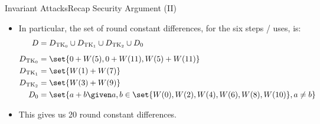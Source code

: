 \begin{frame}{Invariant Attacks}{Recap Security Argument (II)}
\begin{itemize}
            \item In particular, the set of round constant differences, for the six steps \clyde/ uses, is:
                \begin{align*}
                    D &= D_{\mathrm{TK}_0} \cup D_{\mathrm{TK}_1} \cup D_{\mathrm{TK}_2} \cup D_0\\[5pt]
                    D_{\mathrm{TK}_0} &= \set{0 + W(5), 0 + W(11), W(5) + W(11)} \\
                    D_{\mathrm{TK}_1} &= \set{W(1) + W(7)} \\
                    D_{\mathrm{TK}_2} &= \set{W(3) + W(9)} \\
                    D_{0} &= \set{a + b \given a, b \in \set{W(0), W(2), W(4), W(6), W(8), W(10)}, a \neq b}
                \end{align*}
            \item This gives us 20 round constant differences.
        \end{itemize}
%
\end{frame}

